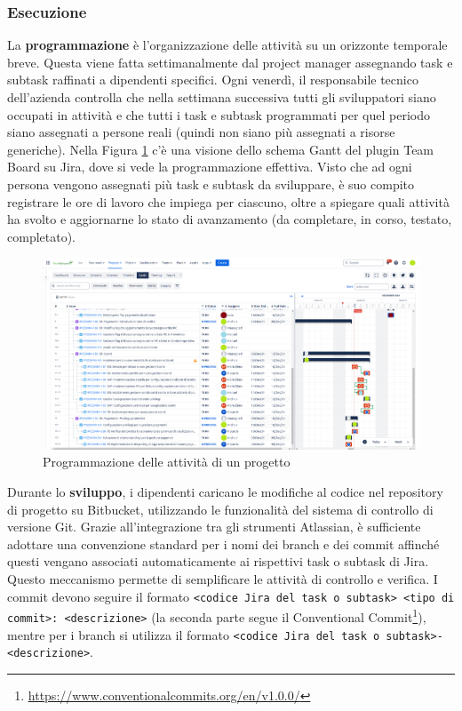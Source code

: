         \subsubsection{Esecuzione}
        La \textbf{programmazione} è l’organizzazione delle attività su un orizzonte temporale breve. Questa viene fatta settimanalmente dal project manager assegnando
        task e subtask raffinati a dipendenti specifici. Ogni venerdì, il responsabile tecnico dell’azienda controlla che nella settimana successiva tutti gli
        sviluppatori siano occupati in attività e che tutti i task e subtask programmati per quel periodo siano assegnati a persone reali (quindi non siano più
        assegnati a risorse generiche). Nella Figura \ref{fig:programmazione-jira-progetto} c'è una visione dello schema Gantt del plugin Team Board su Jira, dove si vede la programmazione effettiva.
        Visto che ad ogni persona vengono assegnati più task e subtask da sviluppare, è suo compito registrare le ore di lavoro che impiega per ciascuno,
        oltre a spiegare quali attività ha svolto e aggiornarne lo stato di avanzamento (da completare, in corso, testato, completato).

        \begin{figure}
            \centering
            \includegraphics[width=\linewidth]{figures/programmazioneAttivita.png}
            \caption{Programmazione delle attività di un progetto}
            \label{fig:programmazione-jira-progetto}
        \end{figure}

        Durante lo \textbf{sviluppo}, i dipendenti caricano le modifiche al codice nel repository di progetto su Bitbucket, utilizzando le funzionalità del sistema
        di controllo di versione Git. Grazie all’integrazione tra gli strumenti Atlassian, è sufficiente adottare una convenzione standard per i nomi dei
        branch e dei commit affinché questi vengano associati automaticamente ai rispettivi task o subtask di Jira. Questo meccanismo permette di semplificare
        le attività di controllo e verifica. I commit devono seguire il formato \texttt{<codice Jira del task o subtask> <tipo di commit>: <descrizione>} (la
        seconda parte segue il Conventional Commit\footnote{\url{https://www.conventionalcommits.org/en/v1.0.0/}}), mentre per i branch si utilizza il formato \texttt{<codice Jira del task o subtask>-<descrizione>}.

